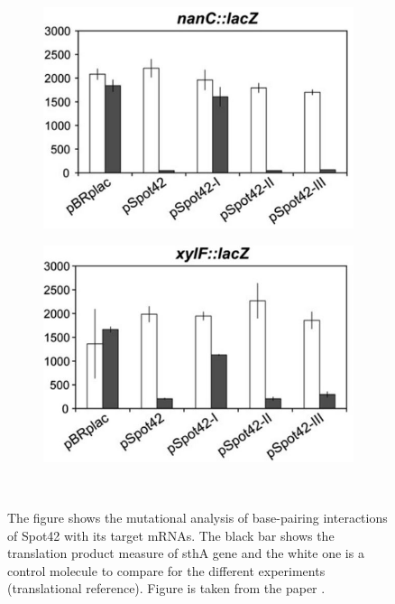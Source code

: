 \documentclass[twoside,a4paper]{report}
\numberwithin{equation}{section}
\begin{document}
\begin{figure}[h!tb]
\begin{subfigure}{.5\textwidth}
		\label{fig:srlA}
	\end{subfigure}
	\begin{subfigure}{.5\textwidth}
		\centering
		\includegraphics[width=.7\linewidth]{nanC}
		\label{fig:nanC}
	\end{subfigure}%
	\begin{subfigure}{.5\textwidth}
		\centering
		\includegraphics[width=.7\linewidth]{xylF}
	
		\label{fig:xylF}
	\end{subfigure}
	\
	\caption{The figure shows the mutational analysis of base-pairing interactions of Spot42 with its target mRNAs. The black bar shows the translation product measure of sthA gene and the white one is a control molecule to compare for the different experiments (translational reference). Figure is taken from the paper \citep{beisel2011base} .\\ }
	\label{fig:all}
\end{figure}
\end{document}
